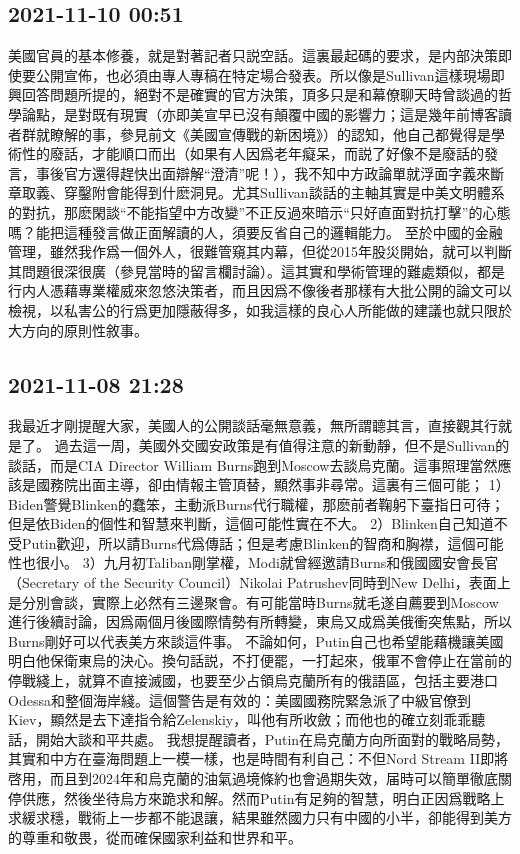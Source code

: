 \documentclass[twocolumn]{ctexart}
\begin{document}
\subsection*{2021-11-10 00:51}

美國官員的基本修養，就是對著記者只説空話。這裏最起碼的要求，是内部決策即使要公開宣佈，也必須由專人專稿在特定場合發表。所以像是Sullivan這樣現場即興回答問題所提的，絕對不是確實的官方決策，頂多只是和幕僚聊天時曾談過的哲學論點，是對既有現實（亦即美宣早已沒有顛覆中國的影響力；這是幾年前博客讀者群就瞭解的事，參見前文《美國宣傳戰的新困境》）的認知，他自己都覺得是學術性的廢話，才能順口而出（如果有人因爲老年癡呆，而説了好像不是廢話的發言，事後官方還得趕快出面辯解“澄清”呢！），我不知中方政論單就浮面字義來斷章取義、穿鑿附會能得到什麽洞見。尤其Sullivan談話的主軸其實是中美文明體系的對抗，那麽閑談“不能指望中方改變”不正反過來暗示“只好直面對抗打擊”的心態嗎？能把這種發言做正面解讀的人，須要反省自己的邏輯能力。
至於中國的金融管理，雖然我作爲一個外人，很難管窺其内幕，但從2015年股災開始，就可以判斷其問題很深很廣（參見當時的留言欄討論）。這其實和學術管理的難處類似，都是行内人憑藉專業權威來忽悠決策者，而且因爲不像後者那樣有大批公開的論文可以檢視，以私害公的行爲更加隱蔽得多，如我這樣的良心人所能做的建議也就只限於大方向的原則性敘事。
\subsection*{2021-11-08 21:28}

我最近才剛提醒大家，美國人的公開談話毫無意義，無所謂聼其言，直接觀其行就是了。
過去這一周，美國外交國安政策是有值得注意的新動靜，但不是Sullivan的談話，而是CIA Director William Burns跑到Moscow去談烏克蘭。這事照理當然應該是國務院出面主導，卻由情報主管頂替，顯然事非尋常。這裏有三個可能；
1）Biden警覺Blinken的蠢笨，主動派Burns代行職權，那麽前者鞠躬下臺指日可待；但是依Biden的個性和智慧來判斷，這個可能性實在不大。
2）Blinken自己知道不受Putin歡迎，所以請Burns代爲傳話；但是考慮Blinken的智商和胸襟，這個可能性也很小。
3）九月初Taliban剛掌權，Modi就曾經邀請Burns和俄國國安會長官（Secretary of the Security Council）Nikolai Patrushev同時到New Delhi，表面上是分別會談，實際上必然有三邊聚會。有可能當時Burns就毛遂自薦要到Moscow進行後續討論，因爲兩個月後國際情勢有所轉變，東烏又成爲美俄衝突焦點，所以Burns剛好可以代表美方來談這件事。
不論如何，Putin自己也希望能藉機讓美國明白他保衛東烏的決心。換句話説，不打便罷，一打起來，俄軍不會停止在當前的停戰綫上，就算不直接滅國，也要至少占領烏克蘭所有的俄語區，包括主要港口Odessa和整個海岸綫。這個警告是有效的：美國國務院緊急派了中級官僚到Kiev，顯然是去下達指令給Zelenskiy，叫他有所收斂；而他也的確立刻乖乖聽話，開始大談和平共處。
我想提醒讀者，Putin在烏克蘭方向所面對的戰略局勢，其實和中方在臺海問題上一模一樣，也是時間有利自己：不但Nord Stream II即將啓用，而且到2024年和烏克蘭的油氣過境條約也會過期失效，届時可以簡單徹底關停供應，然後坐待烏方來跪求和解。然而Putin有足夠的智慧，明白正因爲戰略上求緩求穩，戰術上一步都不能退讓，結果雖然國力只有中國的小半，卻能得到美方的尊重和敬畏，從而確保國家利益和世界和平。
\end{document}

